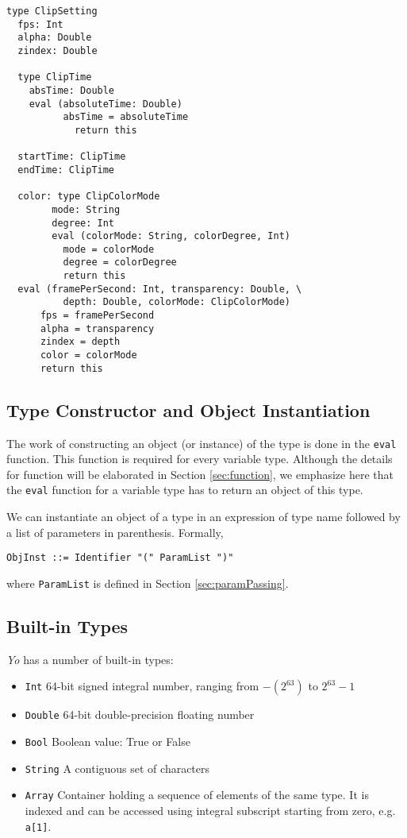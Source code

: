 \documentclass[12pt]{article}
\begin{document}
\begin{lstlisting}[caption=Type Definition Example]
type ClipSetting
  fps: Int
  alpha: Double
  zindex: Double
    
  type ClipTime
    absTime: Double
    eval (absoluteTime: Double)
          absTime = absoluteTime
            return this
    
  startTime: ClipTime
  endTime: ClipTime
    
  color: type ClipColorMode
        mode: String
        degree: Int
        eval (colorMode: String, colorDegree, Int)
          mode = colorMode
          degree = colorDegree
          return this
  eval (framePerSecond: Int, transparency: Double, \
          depth: Double, colorMode: ClipColorMode)
      fps = framePerSecond
      alpha = transparency
      zindex = depth
      color = colorMode
      return this
\end{lstlisting}

\subsection{Type Constructor and Object Instantiation}
The work of constructing an object (or instance) of the type is done in the \texttt{eval} function. This function is required for every variable type. Although the details for function will be elaborated in Section \ref{sec:function}, we emphasize here that the \texttt{eval} function for a variable type has to return an object of this type.

We can instantiate an object of a type in an expression of type name followed by a list of parameters in parenthesis. Formally,
\begin{lstlisting}[caption=Object Instantiation Syntax]
ObjInst ::= Identifier "(" ParamList ")"
\end{lstlisting}
where \texttt{ParamList} is defined in Section \ref{sec:paramPassing}.

\subsection{Built-in Types} %
\textit{Yo} has a number of built-in types:
\begin{itemize}
\item \texttt{Int} 64-bit signed integral number, ranging from $-(2^{63})$ to $2^{63}-1$
\item \texttt{Double} 64-bit double-precision floating number
\item \texttt{Bool} Boolean value: True or False
\item \texttt{String} A contiguous set of characters
\item \texttt{Array} Container holding a sequence of elements of the same type. It is indexed and can be accessed using integral subscript starting from zero, e.g. \texttt{a[1]}.
\end{itemize}
\end{document}
